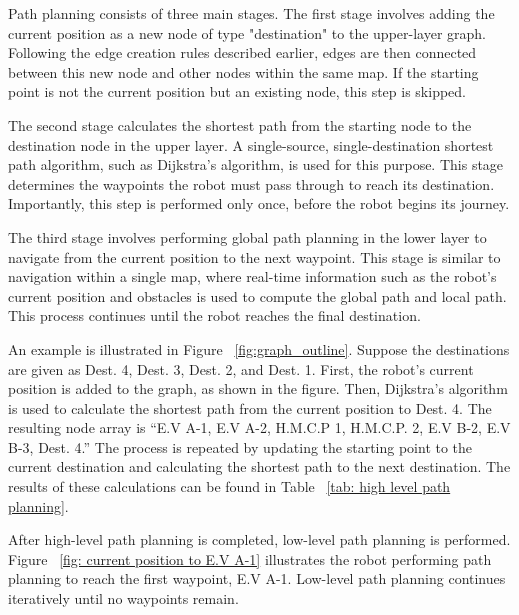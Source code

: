 \documentclass[en]{snu-cse-bsc-thesis}
\begin{document}
Path planning consists of three main stages. The first stage involves adding the current position as a new node of type "destination" to the upper-layer graph. Following the edge creation rules described earlier, edges are then connected between this new node and other nodes within the same map. If the starting point is not the current position but an existing node, this step is skipped.

The second stage calculates the shortest path from the starting node to the destination node in the upper layer. A single-source, single-destination shortest path algorithm, such as Dijkstra’s algorithm, is used for this purpose. This stage determines the waypoints the robot must pass through to reach its destination. Importantly, this step is performed only once, before the robot begins its journey.

The third stage involves performing global path planning in the lower layer to navigate from the current position to the next waypoint. This stage is similar to navigation within a single map, where real-time information such as the robot's current position and obstacles is used to compute the global path and local path. This process continues until the robot reaches the final destination.

An example is illustrated in Figure ~\ref{fig:graph_outline}. Suppose the destinations are given as Dest. 4, Dest. 3, Dest. 2, and Dest. 1. First, the robot's current position is added to the graph, as shown in the figure. Then, Dijkstra’s algorithm is used to calculate the shortest path from the current position to Dest. 4. The resulting node array is “E.V A-1, E.V A-2, H.M.C.P 1, H.M.C.P. 2, E.V B-2, E.V B-3, Dest. 4.” The process is repeated by updating the starting point to the current destination and calculating the shortest path to the next destination. The results of these calculations can be found in Table ~\ref{tab: high level path planning}.

After high-level path planning is completed, low-level path planning is performed. Figure ~\ref{fig: current position to E.V A-1} illustrates the robot performing path planning to reach the first waypoint, E.V A-1. Low-level path planning continues iteratively until no waypoints remain.
\end{document}
